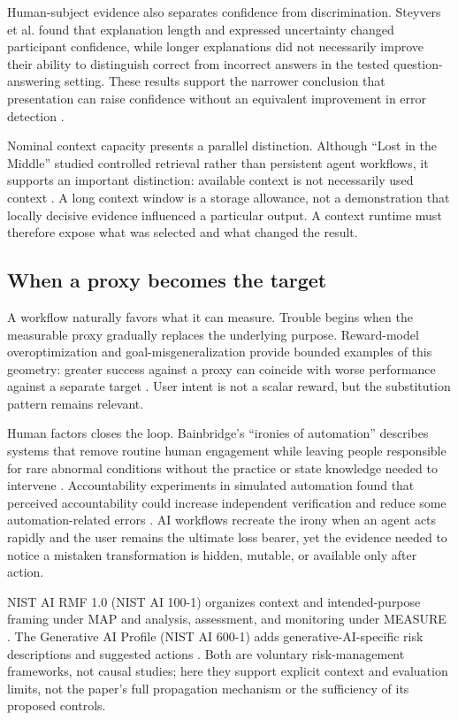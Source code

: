 \documentclass[10pt,a4paper]{article}
\begin{document}
Human-subject evidence also separates confidence from discrimination. Steyvers et al. found that explanation length and expressed uncertainty changed participant confidence, while longer explanations did not necessarily improve their ability to distinguish correct from incorrect answers in the tested question-answering setting. These results support the narrower conclusion that presentation can raise confidence without an equivalent improvement in error detection \cite{steyvers2025}.

Nominal context capacity presents a parallel distinction. Although ``Lost in the Middle'' studied controlled retrieval rather than persistent agent workflows, it supports an important distinction: available context is not necessarily used context \cite{lostmiddle}. A long context window is a storage allowance, not a demonstration that locally decisive evidence influenced a particular output. A context runtime must therefore expose what was selected and what changed the result.

\subsection{When a proxy becomes the target}

A workflow naturally favors what it can measure. Trouble begins when the measurable proxy gradually replaces the underlying purpose. Reward-model overoptimization and goal-misgeneralization provide bounded examples of this geometry: greater success against a proxy can coincide with worse performance against a separate target \cite{gao2023,langosco2022}. User intent is not a scalar reward, but the substitution pattern remains relevant.

Human factors closes the loop. Bainbridge's ``ironies of automation'' describes systems that remove routine human engagement while leaving people responsible for rare abnormal conditions without the practice or state knowledge needed to intervene \cite{bainbridge1983}. Accountability experiments in simulated automation found that perceived accountability could increase independent verification and reduce some automation-related errors \cite{mosier1996}. AI workflows recreate the irony when an agent acts rapidly and the user remains the ultimate loss bearer, yet the evidence needed to notice a mistaken transformation is hidden, mutable, or available only after action.

NIST AI RMF 1.0 (NIST AI 100-1) organizes context and intended-purpose framing under MAP and analysis, assessment, and monitoring under MEASURE \cite{nistairmf}. The Generative AI Profile (NIST AI 600-1) adds generative-AI-specific risk descriptions and suggested actions \cite{nistgenai}. Both are voluntary risk-management frameworks, not causal studies; here they support explicit context and evaluation limits, not the paper's full propagation mechanism or the sufficiency of its proposed controls.
\end{document}
